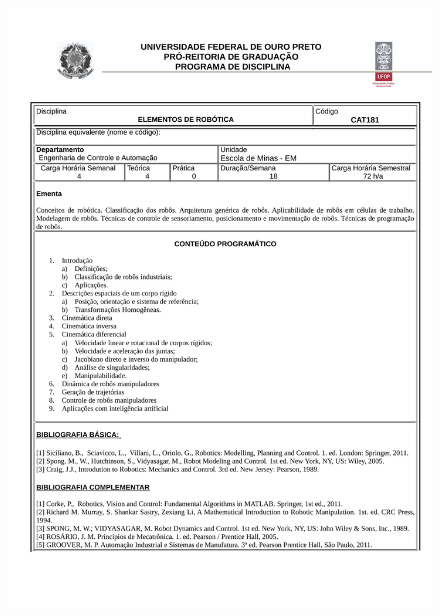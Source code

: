\begin{figure}[p]
	\centering 
	\includegraphics[scale=0.7]{capitulos/anexo1-programas-disciplina/p74.pdf}
\end{figure}

